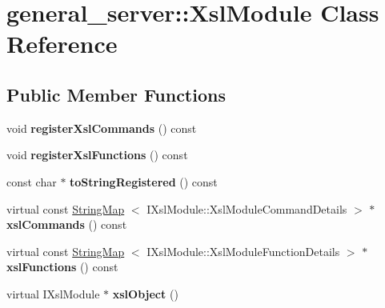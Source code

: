 \hypertarget{classgeneral__server_1_1XslModule}{\section{general\-\_\-server\-:\-:\-Xsl\-Module \-Class \-Reference}
\label{classgeneral__server_1_1XslModule}
}
\subsection*{\-Public \-Member \-Functions}
\begin{DoxyCompactItemize}
\item 
\hypertarget{classgeneral__server_1_1XslModule_aab5ed030b423afafc2ce567ac1eef18c}{void {\bfseries register\-Xsl\-Commands} () const }\label{classgeneral__server_1_1XslModule_aab5ed030b423afafc2ce567ac1eef18c}

\item 
\hypertarget{classgeneral__server_1_1XslModule_a6431326035003b5833b1545010cd27fd}{void {\bfseries register\-Xsl\-Functions} () const }\label{classgeneral__server_1_1XslModule_a6431326035003b5833b1545010cd27fd}

\item 
\hypertarget{classgeneral__server_1_1XslModule_aac6c3802bd3026313c3482976834580f}{const char $\ast$ {\bfseries to\-String\-Registered} () const }\label{classgeneral__server_1_1XslModule_aac6c3802bd3026313c3482976834580f}

\item 
\hypertarget{classgeneral__server_1_1XslModule_a0fd639686c5d732a574ba326d92cb285}{virtual const \hyperlink{classgeneral__server_1_1StringMap}{\-String\-Map}\*
$<$ \-I\-Xsl\-Module\-::\-Xsl\-Module\-Command\-Details $>$ $\ast$ {\bfseries xsl\-Commands} () const }\label{classgeneral__server_1_1XslModule_a0fd639686c5d732a574ba326d92cb285}

\item 
\hypertarget{classgeneral__server_1_1XslModule_a6e76a9ffa0a53b796d1af21e988deaad}{virtual const \hyperlink{classgeneral__server_1_1StringMap}{\-String\-Map}\*
$<$ \-I\-Xsl\-Module\-::\-Xsl\-Module\-Function\-Details $>$ $\ast$ {\bfseries xsl\-Functions} () const }\label{classgeneral__server_1_1XslModule_a6e76a9ffa0a53b796d1af21e988deaad}

\item 
\hypertarget{classgeneral__server_1_1XslModule_a7cc67ff1f14ee7d5d6e579aeeb2c9938}{virtual \-I\-Xsl\-Module $\ast$ {\bfseries xsl\-Object} ()}\label{classgeneral__server_1_1XslModule_a7cc67ff1f14ee7d5d6e579aeeb2c9938}


\end{DoxyCompactItemize}
